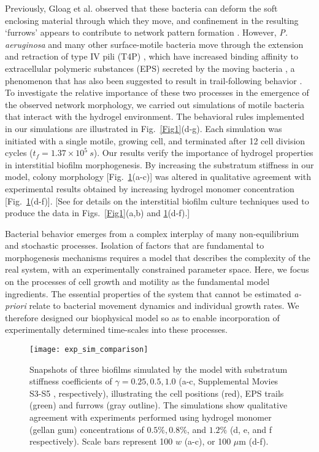 \documentclass[aps,prl,numerical,reprint,superscriptaddress,showpacs]{revtex4-1}
\begin{document}
Previously, Gloag et al. observed that these bacteria can deform the soft enclosing material through which they move, and confinement in the resulting `furrows' appears to contribute to network pattern formation \cite{gloag2013self}. However, {\it P. aeruginosa} and many other surface-motile bacteria \cite{pelicic2008type} move through the extension and retraction of type IV pili (T4P) \cite{skerker2001direct}, which have increased binding affinity to extracellular polymeric substances (EPS) secreted by the moving bacteria \cite{maier2015bacteria}, a phenomenon that has also been suggested to result in trail-following behavior \cite{Gelimson2016Multicellular,kranz2016trails}. To investigate the relative importance of these two  processes in the emergence of the observed network morphology, we carried out simulations of motile bacteria that interact with the hydrogel environment. The behavioral rules implemented in our simulations are illustrated in Fig.~\ref{Fig1}(d-g). Each simulation was initiated with a single motile, growing cell, and terminated after 12 cell division cycles ($t_{f} = 1.37\times 10^5~s$). Our results verify the importance of hydrogel properties in interstitial biofilm morphogenesis. By increasing the substratum stiffness in our model, colony morphology [Fig.~\ref{FigES}(a-c)] was altered in qualitative agreement with experimental results obtained by increasing hydrogel monomer concentration [Fig.~\ref{FigES}(d-f)]. [See \cite{Turnbull2014} for details on the interstitial biofilm culture techniques used to produce the data in Figs.~\ref{Fig1}(a,b) and \ref{FigES}(d-f).]


Bacterial behavior emerges from a complex interplay of many non-equilibrium and stochastic processes. Isolation of factors that are fundamental to morphogenesis mechanisms requires a model that describes the complexity of the real system, with an experimentally constrained parameter space. Here, we focus on the processes of cell growth and motility as the fundamental model ingredients. The essential properties of the system that cannot be estimated {\it a-priori} relate to bacterial movement dynamics and individual growth rates. We therefore designed our biophysical model so as to enable incorporation of experimentally determined time-scales into these processes.  


\begin{figure}
\centering
{\texttt{[image: exp\_sim\_comparison]}}
\caption{Snapshots of three biofilms simulated by the model with substratum stiffness coefficients of $\gamma = 0.25, 0.5, 1.0$ (a-c, Supplemental Movies S3-S5 \cite{Supp}, respectively), illustrating the cell positions (red), EPS trails (green) and furrows (gray outline). The simulations show qualitative agreement with experiments performed using hydrogel monomer (gellan gum) concentrations of $0.5\%, 0.8\%$, and $1.2\%$  (d, e, and f respectively). Scale bars represent 100 $w$ (a-c), or 100 $\mu$m (d-f). }
\label{FigES}
\end{figure}
\end{document}
